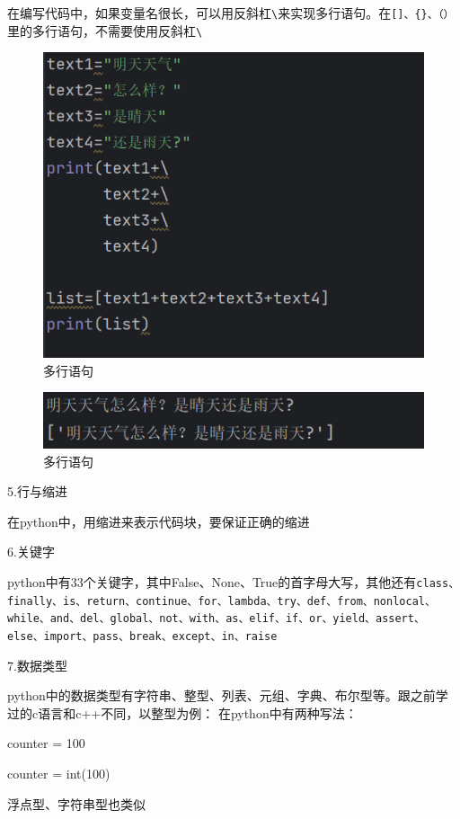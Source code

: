 \documentclass{ctexart}
\begin{document}
	在编写代码中，如果变量名很长，可以用反斜杠\verb|\|来实现多行语句。在\verb|[]、{}、（）|里的多行语句，不需要使用反斜杠\verb|\|
	
	\begin{figure}[H]
		\centering
		\includegraphics{3.7}
		\caption{多行语句}
	\end{figure}
	
	
	\begin{figure}[H]
		\centering
		\includegraphics{3.8}
		\caption{多行语句}
	\end{figure}
	5.行与缩进
	
	在python中，用缩进来表示代码块，要保证正确的缩进
	
	6.关键字
	
	python中有33个关键字，其中False、None、True的首字母大写，其他还有\verb|class、finally、is、return、continue、for、lambda、try、def、from、nonlocal、while、and、del、global、not、with、as、elif、if、or、yield、assert、else、import、pass、break、except、in、raise|
	
	7.数据类型
	
	python中的数据类型有字符串、整型、列表、元组、字典、布尔型等。跟之前学过的c语言和c++不同，以整型为例：
	在python中有两种写法：
	
	counter = 100
	
	counter = int(100)
	
	浮点型、字符串型也类似
	
\end{document}
